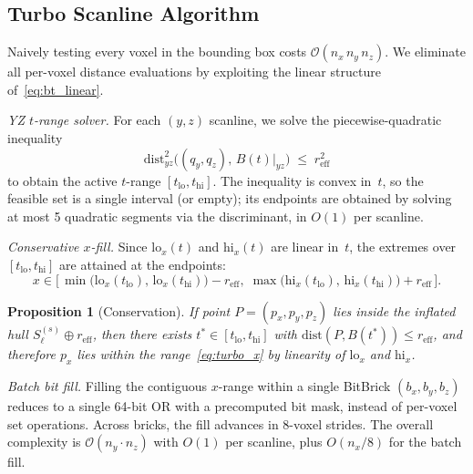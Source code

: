 \documentclass[journal]{IEEEtran}
\newtheorem{proposition}{Proposition}
\newcommand{\calO}{\mathcal{O}}
\begin{document}
\subsection{Turbo Scanline Algorithm}\label{sec:turbo}

Naively testing every voxel in the bounding box costs
$\calO(n_x\,n_y\,n_z)$.
We eliminate all per-voxel distance evaluations by exploiting the
linear structure of~\eqref{eq:bt_linear}.

\emph{YZ $t$-range solver.}
For each $(y,z)$ scanline, we solve the piecewise-quadratic inequality
\begin{equation}\label{eq:yz_ineq}
  \mathrm{dist}^2_{yz}\!\bigl((q_y,q_z),\, B(t)|_{yz}\bigr) \;\le\; r_{\text{eff}}^2
\end{equation}
to obtain the active $t$-range $[t_{\mathrm{lo}}, t_{\mathrm{hi}}]$.
The inequality is convex in~$t$, so the feasible set is a single
interval (or empty); its endpoints are obtained by solving at most
5 quadratic segments via the discriminant, in $O(1)$ per scanline.

\emph{Conservative $x$-fill.}
Since $\mathrm{lo}_x(t)$ and $\mathrm{hi}_x(t)$ are linear in~$t$,
the extremes over $[t_{\mathrm{lo}}, t_{\mathrm{hi}}]$ are attained
at the endpoints:
\begin{equation}\label{eq:turbo_x}
  x \in \bigl[\,
    \min\!\bigl(\mathrm{lo}_x(t_{\mathrm{lo}}),\,\mathrm{lo}_x(t_{\mathrm{hi}})\bigr) - r_{\text{eff}},\;
    \max\!\bigl(\mathrm{hi}_x(t_{\mathrm{lo}}),\,\mathrm{hi}_x(t_{\mathrm{hi}})\bigr) + r_{\text{eff}}
  \,\bigr].
\end{equation}

\begin{proposition}[Conservation]\label{prop:turbo_conserv}
If point $P{=}(p_x,p_y,p_z)$ lies inside the inflated hull
$S_\ell^{(s)} \oplus r_{\text{eff}}$, then there exists
$t^* \in [t_{\mathrm{lo}},t_{\mathrm{hi}}]$ with
$\mathrm{dist}(P,B(t^*)) \le r_{\text{eff}}$, and therefore
$p_x$ lies within the range~\eqref{eq:turbo_x} by linearity of
$\mathrm{lo}_x$ and $\mathrm{hi}_x$.
\end{proposition}

\emph{Batch bit fill.}
Filling the contiguous $x$-range within a single BitBrick
$(b_x, b_y, b_z)$ reduces to a single 64-bit OR with a
precomputed bit mask, instead of per-voxel set operations.
Across bricks, the fill advances in 8-voxel strides.
The overall complexity is $\calO(n_y \cdot n_z)$ with $O(1)$ per
scanline, plus $O(n_x/8)$ for the batch fill.
\end{document}
